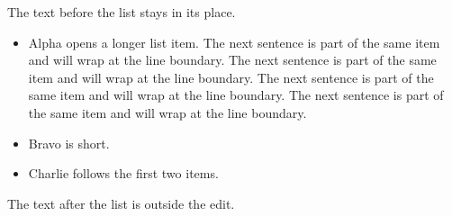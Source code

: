 \documentclass[12pt]{article}
\begin{document}
The text before the list stays in its place.

\begin{itemize}
\item Alpha opens a longer list item. The next sentence is part of the same item and will wrap at the line boundary. The next sentence is part of the same item and will wrap at the line boundary. The next sentence is part of the same item and will wrap at the line boundary. The next sentence is part of the same item and will wrap at the line boundary.
\item Bravo is short.
\item Charlie follows the first two items.
\end{itemize}
The text after the list is outside the edit.
\end{document}
